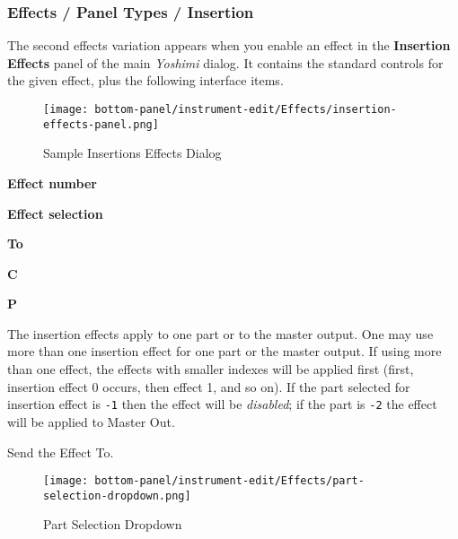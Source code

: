 \subsubsection{Effects / Panel Types / Insertion }
\label{subsubsec:effects_paneltypes_insertion}

   The second effects variation
   appears when you enable an effect in the
   \textbf{Insertion Effects}
   panel of the main \textsl{Yoshimi} dialog.
   It contains the standard
   controls for the given effect, plus the following interface items.

\begin{figure}[H]
   \centering
   \texttt{[image: bottom-panel/instrument-edit/Effects/insertion-effects-panel.png]}
   \caption{Sample Insertions Effects Dialog}
   \label{fig:sample_insertion_effects_dialog}
\end{figure}

   \begin{enumber}
      \item \textbf{Effect number}
      \item \textbf{Effect selection}
      \item \textbf{To}
      \item \textbf{C}
      \item \textbf{P}
   \end{enumber}

   The insertion effects apply to one part or to the master output.
   One may use more
   than one insertion effect for one part or the master output.
   If using more than one effect, the
   effects with smaller indexes will be applied first (first, insertion
   effect 0 occurs, then effect 1, and so on).
   If the part selected for insertion
   effect is \texttt{-1} then the effect will be \textsl{disabled};
   if the part is \texttt{-2} the
   effect will be applied to Master Out.

   \setcounter{ItemCounter}{0}      %

   Send the Effect To.

\begin{figure}[H]
   \centering
   \texttt{[image: bottom-panel/instrument-edit/Effects/part-selection-dropdown.png]}
   \caption{Part Selection Dropdown}
   \label{fig:sample_part_selection_dropdown}
\end{figure}

